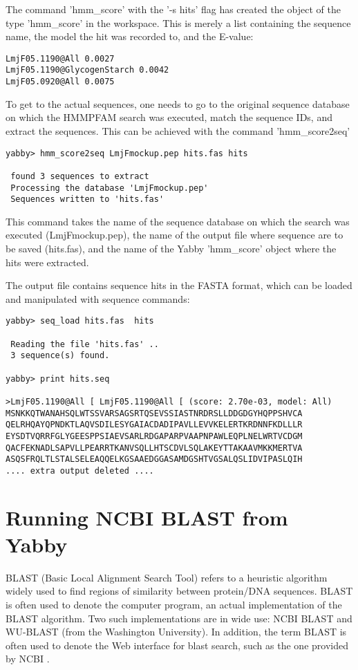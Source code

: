 The command 'hmm\_score' with the '-s hits' flag has created
the object of the type 'hmm\_score' in the workspace. This is
merely a list containing the sequence name, the model the
hit was recorded to, and the E-value:

\begin{verbatim}
LmjF05.1190@All 0.0027
LmjF05.1190@GlycogenStarch 0.0042
LmjF05.0920@All 0.0075
\end{verbatim}

To get to the actual sequences, one needs to go to the
original sequence database on which the HMMPFAM search
was executed, match the sequence IDs, and extract the
sequences. This can be achieved with the command
'hmm\_score2seq'

\begin{verbatim}
yabby> hmm_score2seq LmjFmockup.pep hits.fas hits

 found 3 sequences to extract
 Processing the database 'LmjFmockup.pep'
 Sequences written to 'hits.fas'
\end{verbatim}

This command takes the name of the sequence database on
which the search was executed (LmjFmockup.pep), the name
of the output file where sequence are to be saved (hits.fas),
and the name of the Yabby 'hmm\_score' object where the
hits were extracted.

The output file contains sequence hits in the FASTA format,
which can be loaded and manipulated with sequence commands: 

\begin{verbatim}
yabby> seq_load hits.fas  hits

 Reading the file 'hits.fas' ..
 3 sequence(s) found.

yabby> print hits.seq

>LmjF05.1190@All [ LmjF05.1190@All [ (score: 2.70e-03, model: All)
MSNKKQTWANAHSQLWTSSVARSAGSRTQSEVSSIASTNRDRSLLDDGDGYHQPPSHVCA
QELRHQAYQPNDKTLAQVSDILESYGAIACDADIPAVLLEVVKELERTKRDNNFKDLLLR
EYSDTVQRRFGLYGEESPPSIAEVSARLRDGAPARPVAAPNPAWLEQPLNELWRTVCDGM
QACFEKNADLSAPVLLPEARRTKANVSQLLHTSCDVLSQLAKEYTTAKAAVMKKMERTVA
ASQSFRQLTLSTALSELEAQQELKGSAAEDGGASAMDGSHTVGSALQSLIDVIPASLQIH
.... extra output deleted ....
\end{verbatim}


\section{Running NCBI BLAST from Yabby}

BLAST (Basic Local Alignment Search Tool) refers to a heuristic
algorithm widely used to find regions of similarity between
protein/DNA sequences. BLAST is often used to denote the computer
program, an actual implementation of the BLAST algorithm. Two
such implementations are in wide use: NCBI BLAST and WU-BLAST
(from the Washington University). In addition, the term BLAST
is often used to denote the Web interface for blast search,
such as the one provided by NCBI \cite{wwwblast}.

